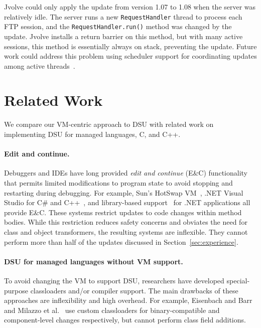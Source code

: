 \documentclass[9pt]{sigplanconf}
\newcommand{\DSU}{{\sc Jvolve}}
\begin{document}
\DSU{} could only apply the update from version 1.07 to 1.08 when the
server was relatively idle.
The server runs a new {\tt RequestHandler} thread to process each FTP
session, and the \texttt{RequestHandler.run()} method was changed by
the update.   \DSU{} installs a return barrier on this method,
but with many active sessions, this method is essentially always on stack,
preventing the update.  Future work could address this problem using scheduler support
for coordinating updates among active threads~\cite{neamtiu09stump}.
\section{Related Work}
\label{sec:related}
We compare our VM-centric approach to DSU with related work on
implementing DSU for managed languages, C, and C++.

\paragraph{Edit and continue.}

Debuggers and IDEs have long provided \emph{edit and continue} (E\&C)
functionality that permits limited modifications to program state to
avoid stopping and restarting during debugging. For example, Sun's
HotSwap VM~\cite{JVMhotswap,Dmit01a}, .NET Visual Studio for C\# and
C++~\cite{VSEnC}, and library-based support~\cite{eaddy05enc} for .NET
applications all provide E\&C.  These systems restrict updates to
code changes within method bodies.  While this restriction reduces safety
concerns and obviates the need for class and object transformers, the resulting
systems are inflexible. They cannot perform more than half of the updates discussed in
Section~\ref{sec:experience}.

\paragraph{DSU for managed languages without VM support. } To avoid
changing the VM to support DSU, researchers have developed special-purpose
classloaders and/or compiler support.  The main drawbacks of these
approaches are inflexibility and high overhead.
For example, Eisenbach and Barr~\cite{BarrE03} and Milazzo et
al.~\cite{Milazzo05updates} use custom classloaders for
binary-compatible and component-level changes respectively, but
cannot perform class field additions.
\end{document}
